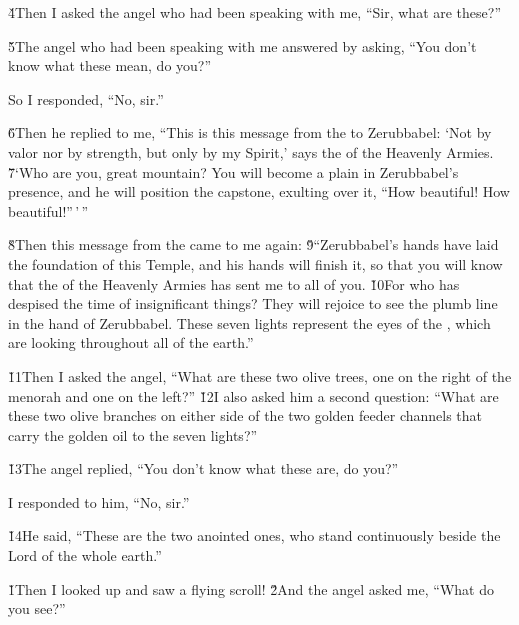 \v{4}Then I asked the angel who had been speaking with me, ``Sir, what are these?''

\v{5}The angel who had been speaking with me answered by asking, ``You don't know what these mean, do you?''

So I responded, ``No, sir.''

\v{6}Then he replied to me, ``This is this message from the  to Zerubbabel: `Not by valor nor by strength, but only by my Spirit,' says the  of the Heavenly Armies. \v{7}`Who are you, great mountain? You will become a plain in Zerubbabel's presence, and he will position the capstone, exulting over it, ``How beautiful! How beautiful!''\,'\,''

\v{8}Then this message from the  came to me again: \v{9}``Zerubbabel's hands have laid the foundation of this Temple, and his hands will finish it, so that you will know that the  of the Heavenly Armies has sent me to all of you. \v{10}For who has despised the time of insignificant things? They will rejoice to see the plumb line in the hand of Zerubbabel. These seven lights represent the eyes of the , which are looking throughout all of the earth.''

\v{11}Then I asked the angel, ``What are these two olive trees, one on the right of the menorah and one on the left?'' \v{12}I also asked him a second question: ``What are these two olive branches on either side of the two golden feeder channels that carry the golden oil to the seven lights?''

\v{13}The angel replied, ``You don't know what these are, do you?''

I responded to him, ``No, sir.''

\v{14}He said, ``These are the two anointed ones, who stand continuously beside the Lord of the whole earth.''

\v{1}Then I looked up and saw a flying scroll! \v{2}And the angel asked me, ``What do you see?''

